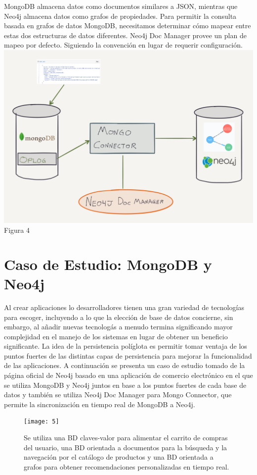 \documentclass[conference]{IEEEtran}
\begin{document}
MongoDB almacena datos como documentos similares a JSON, mientras que Neo4j almacena datos como grafos de propiedades. Para permitir la consulta basada en grafos de datos MongoDB, necesitamos determinar c\'omo mapear entre estas dos estructuras de datos diferentes. Neo4j Doc Manager provee un plan de mapeo por defecto. Siguiendo la convenci\'on en lugar de requerir configuraci\'on.\cite{doc}
\\
\centering
\includegraphics[scale=0.3]{Imagenes/mongo_connector.png}\\Figura 4
\section{Caso de Estudio: MongoDB y Neo4j}
Al crear aplicaciones lo desarrolladores tienen una gran variedad de tecnolog\'ias para escoger, incluyendo a lo que la elecci\'on de base de datos  concierne, sin embargo, al a\~nadir nuevas tecnolog\'as a menudo termina significando mayor complejidad en el manejo de los sistemas en lugar de obtener un beneficio significante. La idea de la persistencia pol\'iglota es permitir tomar ventaja de los puntos fuertes de las distintas capas de persistencia para mejorar la funcionalidad de las aplicaciones. A continuaci\'on se presenta un caso de estudio tomado de la p\'agina oficial de Neo4j \cite{caso} basado en una aplicaci\'on de comercio electr\'onico en el que se utiliza MongoDB y Neo4j juntos en base a los puntos fuertes de cada base de datos y tambi\'en se utiliza Neo4j Doc Manager para Mongo Connector, que permite la sincronizaci\'on en tiempo real de MongoDB a Neo4j.

\begin{figure}[!h]
\centering
\texttt{[image: 5]}
\caption{Se utiliza una BD claves-valor para alimentar el carrito de compras del usuario, una BD orientada a  documentos para la b\'usqueda y la navegaci\'on por el cat\'alogo de productos y una BD orientada a grafos para obtener recomendaciones personalizadas en tiempo real.}
\label{fig5}
\end{figure}
\end{document}
